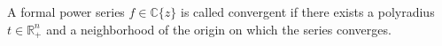 A formal power series $f \in \mathbb{C}\{z\}$ is called convergent if there exists a polyradius $t \in \mathbb{R}_+^n$ and a neighborhood of the origin on which the series converges.
